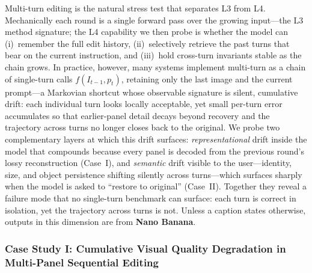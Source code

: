 \begingroup


Multi-turn editing is the natural stress test that separates L3 from L4. Mechanically each round is a single forward pass over the growing input---the L3 method signature; the L4 capability we then probe is whether the model can (i)~remember the full edit history, (ii)~selectively retrieve the past turns that bear on the current instruction, and (iii)~hold cross-turn invariants stable as the chain grows. In practice, however, many systems implement multi-turn as a chain of single-turn calls $f(I_{t-1}, p_t)$, retaining only the last image and the current prompt---a Markovian shortcut whose observable signature is silent, cumulative drift: each individual turn looks locally acceptable, yet small per-turn error accumulates so that earlier-panel detail decays beyond recovery and the trajectory across turns no longer closes back to the original. We probe two complementary layers at which this drift surfaces: \emph{representational} drift inside the model that compounds because every panel is decoded from the previous round's lossy reconstruction (Case~I), and \emph{semantic} drift visible to the user---identity, size, and object persistence shifting silently across turns---which surfaces sharply when the model is asked to ``restore to original'' (Case~II). Together they reveal a failure mode that no single-turn benchmark can surface: each turn is correct in isolation, yet the trajectory across turns is not. Unless a caption states otherwise, outputs in this dimension are from \textbf{Nano Banana}.


\subsubsection{Case Study I: Cumulative Visual Quality Degradation in Multi-Panel Sequential Editing}

